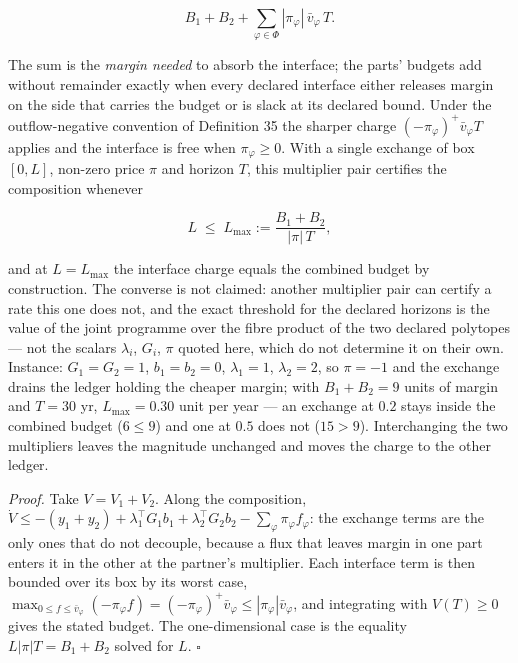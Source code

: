 \documentclass[11pt]{article}
\begin{document}
$$B_1 + B_2 + \sum_{\varphi \in \Phi} |\pi_\varphi|\, \bar v_\varphi\, T .$$

 The sum is the \emph{margin needed} to absorb the interface; the parts' budgets add without remainder exactly when every declared interface either releases margin on the side that carries the budget or is slack at its declared bound. Under the outflow-negative convention of Definition 35 the sharper charge \((-\pi_\varphi)^{+\allowbreak{}}\bar v_\varphi T\) applies and the interface is free when \(\pi_\varphi \ge 0\). With a single exchange of box \([0, L]\), non-zero price \(\pi\) and horizon \(T\), this multiplier pair certifies the composition whenever 

$$L \;\le\; L_{\max} := \frac{B_1 + B_2}{|\pi|\, T},$$

 and at \(L = L_{\max}\) the interface charge equals the combined budget by construction. The converse is not claimed: another multiplier pair can certify a rate this one does not, and the exact threshold for the declared horizons is the value of the joint programme over the fibre product of the two declared polytopes --- not the scalars \(\lambda_i\), \(G_i\), \(\pi\) quoted here, which do not determine it on their own. Instance: \(G_1 = G_2 = 1\), \(b_1 = b_2 = 0\), \(\lambda_1 = 1\), \(\lambda_2 = 2\), so \(\pi = -1\) and the exchange drains the ledger holding the cheaper margin; with \(B_1 + B_2 = 9\) units of margin and \(T = 30\) yr, \(L_{\max} = 0.30\) unit per year --- an exchange at \(0.2\) stays inside the combined budget (\(6 \le 9\)) and one at \(0.5\) does not (\(15 > 9\)). Interchanging the two multipliers leaves the magnitude unchanged and moves the charge to the other ledger.

\emph{Proof.} Take \(V = V_1 + V_2\). Along the composition, \(\dot V \le -(y_1 +\allowbreak{} y_2) +\allowbreak{} \lambda_1^{\top} G_1 b_1 +\allowbreak{} \lambda_2^{\top} G_2 b_2 - \sum_\varphi \pi_\varphi f_\varphi\): the exchange terms are the only ones that do not decouple, because a flux that leaves margin in one part enters it in the other at the partner's multiplier. Each interface term is then bounded over its box by its worst case, \(\max_{0 \le f \le \bar v_\varphi}(-\pi_\varphi f) =\allowbreak{} (-\pi_\varphi)^{+\allowbreak{}}\bar v_\varphi \le |\pi_\varphi|\bar v_\varphi\), and integrating with \(V(T) \ge 0\) gives the stated budget. The one-dimensional case is the equality \(L|\pi|T = B_1 + B_2\) solved for \(L\). \(\square\)
\end{document}
